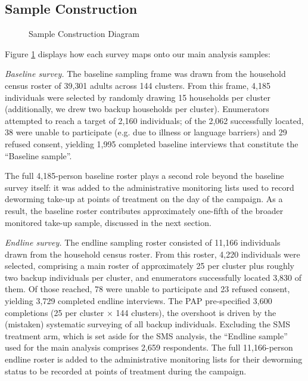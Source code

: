 \documentclass[12pt,a4paper]{article}
\begin{document}
\renewcommand{\thesubsection}{\Alph{subsection}}

\setcounter{figure}{0}
\renewcommand{\thefigure}{D\arabic{figure}}


\subsection{Sample Construction}
\label{app:sample-construction}
\begin{landscape}
    \begin{figure}
      \centering                                                   
      \caption{Sample Construction Diagram}    
      \label{fig:sample-consort}
    \end{figure}  
  \end{landscape}


\clearpage
\newpage

Figure \ref{fig:sample-consort} displays how each survey maps onto our main analysis samples:

\emph{Baseline survey.} The baseline sampling frame was drawn from the household
census roster of 39{,}301 adults across 144 clusters.  From this frame, 4{,}185
individuals were selected by randomly drawing 15 households per cluster (additionally, we drew two backup 
households per cluster).  Enumerators attempted to reach a
target of 2{,}160 individuals; of the 2{,}062 successfully located, 38 were
unable to participate (e.g. due to illness or language barriers) and 29
refused consent, yielding 1{,}995 completed baseline interviews that
constitute the ``Baseline sample''.

The full 4{,}185-person baseline roster plays a second role beyond the baseline
survey itself: it was added to the administrative monitoring lists used to
record deworming take-up at points of treatment on the day of the campaign.  As
a result, the baseline roster contributes approximately one-fifth of the broader
monitored take-up sample, discussed in the next section.


\emph{Endline survey.} The endline sampling roster consisted of 11{,}166
individuals drawn from the household census roster.  From this roster, 4{,}220
individuals were selected, comprising a main roster of approximately 25 per
cluster plus roughly two backup individuals per cluster, and enumerators
successfully located 3{,}830 of them.  Of those reached, 78 were unable to
participate and 23 refused consent, yielding 3{,}729 completed endline
interviews.  The PAP pre-specified 3{,}600 completions (25 per cluster $\times$
144 clusters), the overshoot is driven by the (mistaken) systematic surveying of
all backup individuals. Excluding the SMS treatment arm, which is set aside for
the SMS analysis, the ``Endline sample'' used for the main analysis comprises
2{,}659 respondents.  The full 11{,}166-person endline roster is added to the
administrative monitoring lists for their deworming status to be recorded at
points of treatment during the campaign.
\end{document}
